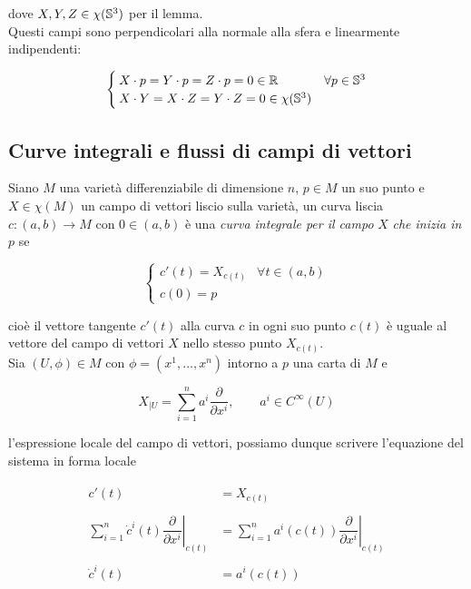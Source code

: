 dove $ X,Y,Z \in \chi(\S^{3}) $ per il lemma.\\
Questi campi sono perpendicolari alla normale alla sfera e linearmente indipendenti:

\begin{equation}
	\begin{cases}
		X \cdot p = Y \cdot p = Z \cdot p = 0 \in \R & \forall p \in \S^{3}\\
		X \cdot Y = X \cdot Z = Y \cdot Z = 0 \in \chi(\S^{3})
	\end{cases}
\end{equation}

\subsection{Curve integrali e flussi di campi di vettori}

Siano $ M $ una varietà differenziabile di dimensione $ n $, $ p \in M $ un suo punto e $ X \in \chi(M) $ un campo di vettori liscio sulla varietà, un curva liscia $ c : (a,b) \to M $ con $ 0 \in (a,b) $ è una \textit{curva integrale per il campo} $ X $ \textit{che inizia in} $ p $ se

\begin{equation}
	\begin{cases}
		c'(t) = X_{c(t)} & \forall t \in (a,b)\\
		c(0) = p
	\end{cases}
\end{equation}

cioè il vettore tangente $ c'(t) $ alla curva $ c $ in ogni suo punto $ c(t) $ è uguale al vettore del campo di vettori $ X $ nello stesso punto $ X_{c(t)} $.\\
Sia $ (U,\phi) \in M $ con $ \phi = (x^{1},\dots,x^{n}) $ intorno a $ p $ una carta di $ M $ e

\begin{equation}
	X_{|U} = \sum_{i=1}^{n} a^{i} \dfrac{\partial}{\partial x^{i}}, \qquad a^{i} \in C^{\infty}(U)
\end{equation}

l'espressione locale del campo di vettori, possiamo dunque scrivere l'equazione del sistema in forma locale

\begin{align}
	\begin{split}
		c'(t) &= X_{c(t)}\\\\
		\sum_{i=1}^{n} \dot{c}^{i}(t) \left. \dfrac{\partial}{\partial x^{i}} \right|_{c(t)} &= \sum_{i=1}^{n} a^{i}(c(t)) \left. \dfrac{\partial}{\partial x^{i}} \right|_{c(t)}\\\\
		\dot{c}^{i}(t) &= a^{i}(c(t))
	\end{split}
\end{align}

